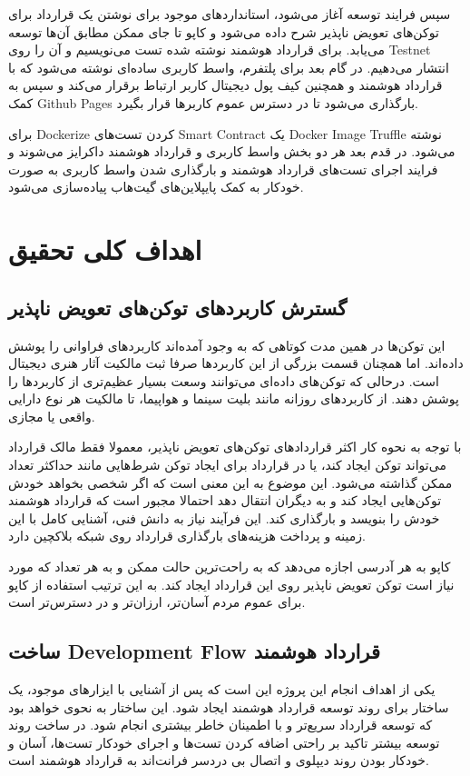 سپس فرایند توسعه آغاز می‌شود، استاندارد‌های موجود برای نوشتن یک قرارداد برای توکن‌های تعویض ناپذیر شرح داده می‌شود و کاپو تا جای ممکن مطابق آن‌ها توسعه می‌یابد. برای قرارداد هوشمند نوشته شده تست می‌نویسیم و آن را روی
\gls{Testnet}
انتشار می‌دهیم.
در گام بعد برای پلتفرم، واسط کاربری ساده‌ای نوشته می‌شود که با قرارداد هوشمند و همچنین کیف پول دیجیتال کاربر ارتباط برقرار می‌کند و سپس به کمک
\gls{Github Pages}
بارگذاری می‌شود تا در دسترس عموم کاربرها قرار بگیرد.

برای
\gls{Dockerize}
کردن تست‌های
\gls{Smart Contract}
یک
\gls{Docker Image}
\gls{Truffle}
نوشته می‌شود. در قدم بعد هر دو بخش واسط کاربری و قرارداد هوشمند داکرایز می‌شوند و فرایند اجرای تست‌های قرارداد هوشمند و بارگذاری شدن واسط کاربری به صورت خودکار به کمک پایپلاین‌های گیت‌هاب پیاده‌سازی می‌شود.


\section{اهداف کلی تحقیق}
\subsection{گسترش کاربرد‌های توکن‌های تعویض ناپذیر}
این توکن‌ها در همین مدت کوتاهی که به وجود آمده‌اند کاربردهای فراوانی را پوشش داده‌اند. اما همچنان قسمت بزرگی از این کاربردها صرفا ثبت مالکیت آثار هنری دیجیتال است. درحالی که توکن‌های داده‌ای می‌توانند وسعت بسیار عظیم‌تری از کاربردها را پوشش دهند. از کاربردهای روزانه مانند بلیت سینما و هواپیما، تا مالکیت هر نوع دارایی واقعی یا مجازی.

با توجه به نحوه کار اکثر قراردادهای توکن‌های تعویض ناپذیر، معمولا فقط مالک قرارداد می‌تواند توکن ایجاد کند، یا در قرارداد برای ایجاد توکن شرط‌هایی مانند حداکثر تعداد ممکن گذاشته می‌شود. این موضوع به این معنی است که اگر شخصی بخواهد خودش توکن‌هایی ایجاد کند و به دیگران انتقال دهد احتمالا مجبور است که قرارداد هوشمند خودش را بنویسد و بارگذاری کند. این فرآیند نیاز به دانش فنی، آشنایی کامل با این زمینه و پرداخت هزینه‌های بارگذاری قرارداد روی شبکه بلاکچین دارد.

کاپو به هر آدرسی اجازه می‌دهد که به راحت‌ترین حالت ممکن و به هر تعداد که مورد نیاز است توکن تعویض ناپذیر روی این قرارداد ایجاد کند. به این ترتیب استفاده از کاپو برای عموم مردم آسان‌تر، ارزان‌تر و در دسترس‌تر است.


\subsection{ساخت
\gls{Development Flow}
قرارداد هوشمند}
یکی از اهداف انجام این پروژه این است که پس از آشنایی با ایزارهای موجود، یک ساختار برای روند توسعه قرارداد هوشمند ایجاد شود. این ساختار به نحوی خواهد بود که توسعه قرارداد سریع‌تر و با اطمینان خاطر بیشتری انجام شود.
در ساخت روند توسعه بیشتر تاکید بر راحتی اضافه کردن تست‌ها و اجرای خودکار تست‌ها، آسان و خودکار بودن روند دیپلوی و اتصال بی دردسر فرانت‌اند به قرارداد هوشمند است.

